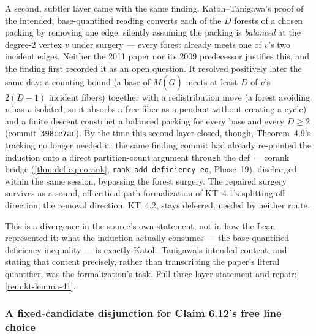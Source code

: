 A second, subtler layer came with the same finding. Katoh--Tanigawa's proof
of the intended, base-quantified reading converts each of the $D$ forests of
a chosen packing by removing one edge, silently assuming the packing is
\emph{balanced} at the degree-2 vertex $v$ under surgery --- every forest
already meets one of $v$'s two incident edges. Neither the 2011 paper nor its
2009 predecessor justifies this, and the finding first recorded it as an open
question. It resolved positively later the same day: a counting bound (a
base of $M(\tilde G)$ meets at least $D$ of $v$'s $2(D-1)$ incident fibers)
together with a redistribution move (a forest avoiding $v$ has $v$ isolated,
so it absorbs a free fiber as a pendant without creating a cycle) and a
finite descent construct a balanced packing for every base and every
$D \ge 2$
(commit~\href{https://github.com/bryangingechen/CombinatorialRigidity/commit/398ce7acb13ff7949848203ee9f63e03a5ded1e4}{\texttt{398ce7ac}}).
By the time this second layer closed, though, Theorem~4.9's tracking no
longer needed it: the same finding commit had already re-pointed the
induction onto a direct partition-count argument through the
def\,$=$\,corank bridge (\cref{thm:def-eq-corank}, \texttt{rank\_add\_deficiency\_eq},
Phase~19), discharged within the same session, bypassing the forest surgery.
The repaired surgery survives as a sound, off-critical-path formalization of
KT~4.1's splitting-off direction; the removal direction, KT~4.2, stays
deferred, needed by neither route.

This is a divergence in the source's own statement, not in how the Lean
represented it: what the induction actually consumes --- the base-quantified
deficiency inequality --- is exactly Katoh--Tanigawa's intended content, and
stating that content precisely, rather than transcribing the paper's literal
quantifier, was the formalization's task. Full three-layer statement and
repair: \cref{rem:kt-lemma-41}.

\subsubsection{A fixed-candidate disjunction for Claim 6.12's free line choice}


